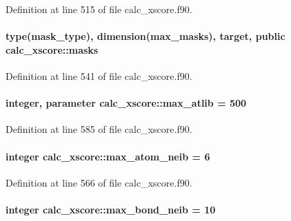 Definition at line 515 of file calc\-\_\-xscore.\-f90.

\hypertarget{classcalc__xscore_a30db4ba703ae8fee5bd58cf5a9da1d71}{
\paragraph[{masks}]{\setlength{\rightskip}{0pt plus 5cm}type(mask\-\_\-type), dimension({\bf max\-\_\-masks}), target, public calc\-\_\-xscore\-::masks}}\label{classcalc__xscore_a30db4ba703ae8fee5bd58cf5a9da1d71}


Definition at line 541 of file calc\-\_\-xscore.\-f90.

\hypertarget{classcalc__xscore_a91527e259ea15022ad9b4c4621744ad7}{
\paragraph[{max\-\_\-atlib}]{\setlength{\rightskip}{0pt plus 5cm}integer, parameter calc\-\_\-xscore\-::max\-\_\-atlib = 500}}\label{classcalc__xscore_a91527e259ea15022ad9b4c4621744ad7}


Definition at line 585 of file calc\-\_\-xscore.\-f90.

\hypertarget{classcalc__xscore_a42e41b69ce6f72a9505878ace053991d}{
\paragraph[{max\-\_\-atom\-\_\-neib}]{\setlength{\rightskip}{0pt plus 5cm}integer calc\-\_\-xscore\-::max\-\_\-atom\-\_\-neib = 6}}\label{classcalc__xscore_a42e41b69ce6f72a9505878ace053991d}


Definition at line 566 of file calc\-\_\-xscore.\-f90.

\hypertarget{classcalc__xscore_ae0ac9278cce837911bc3af80f617f950}{
\paragraph[{max\-\_\-bond\-\_\-neib}]{\setlength{\rightskip}{0pt plus 5cm}integer calc\-\_\-xscore\-::max\-\_\-bond\-\_\-neib = 10}}\label{classcalc__xscore_ae0ac9278cce837911bc3af80f617f950}


